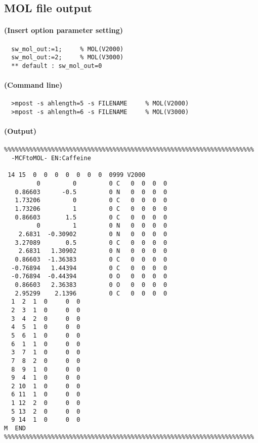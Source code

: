 \documentclass[a4paper]{article}
\begin{document}
\subsection{MOL file output}
\paragraph{(Insert option parameter setting)}
\begin{verbatim}
  sw_mol_out:=1;     % MOL(V2000)
  sw_mol_out:=2;     % MOL(V3000)
  ** default : sw_mol_out=0
\end{verbatim}
\paragraph{(Command line)}
\begin{verbatim}
  >mpost -s ahlength=5 -s FILENAME     % MOL(V2000)
  >mpost -s ahlength=6 -s FILENAME     % MOL(V3000)
\end{verbatim}
\paragraph{(Output)}
\begin{verbatim}
%%%%%%%%%%%%%%%%%%%%%%%%%%%%%%%%%%%%%%%%%%%%%%%%%%%%%%%%%%%%%%%%%%%%%
  -MCFtoMOL- EN:Caffeine         

 14 15  0  0  0  0  0  0  0  0999 V2000
         0         0         0 C   0  0  0  0
   0.86603      -0.5         0 N   0  0  0  0
   1.73206         0         0 C   0  0  0  0
   1.73206         1         0 C   0  0  0  0
   0.86603       1.5         0 C   0  0  0  0
         0         1         0 N   0  0  0  0
    2.6831  -0.30902         0 N   0  0  0  0
   3.27089       0.5         0 C   0  0  0  0
    2.6831   1.30902         0 N   0  0  0  0
   0.86603  -1.36383         0 C   0  0  0  0
  -0.76894   1.44394         0 C   0  0  0  0
  -0.76894  -0.44394         0 O   0  0  0  0
   0.86603   2.36383         0 O   0  0  0  0
   2.95299    2.1396         0 C   0  0  0  0
  1  2  1  0     0  0
  2  3  1  0     0  0
  3  4  2  0     0  0
  4  5  1  0     0  0
  5  6  1  0     0  0
  6  1  1  0     0  0
  3  7  1  0     0  0
  7  8  2  0     0  0
  8  9  1  0     0  0
  9  4  1  0     0  0
  2 10  1  0     0  0
  6 11  1  0     0  0
  1 12  2  0     0  0
  5 13  2  0     0  0
  9 14  1  0     0  0
M  END
%%%%%%%%%%%%%%%%%%%%%%%%%%%%%%%%%%%%%%%%%%%%%%%%%%%%%%%%%%%%%%%%%%%%%
\end{verbatim}%
\newpage
\end{document}
